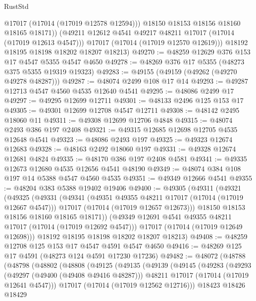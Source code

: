 \begin{lexlean}{RustStd}
\begin{coremodule}
{\begin{coremodule}
{{{{{{{{{{{{{{{{{{{{{{{{{{{{{{{{{{{{{{{{{{{{{{{{{{{{{{{              @17017
              (@17014 (@17019 @12578 @12594)))
            @18150
            @18153
            @18156
            @18160
            @18165
            @18171))
        (@49211 @12612 @4541 @49217 @48211 @17017 (@17014 (@17019 @12613 @4547)))
        @17017
        (@17014 (@17019 @12570 @12619)))
      @18192
      @18195
      @18198
      @18202
      @18207
      @18213)
@49270 := @48259 @12629 @376 @153 @17 @4547 @5355 @4547 @4650
@49278 := @48269 @376 @17 @5355 (@48273 @375 @5355 @19319 @19323)
@49283 := @49155 (@49159 (@49262 (@49270 @49278 @48287)))
@49287 := @48074 @2499 @108 @17 @14
@49293 := @49287 @12713 @4547 @4560 @4535 @12640 @4541
@49295 := @48086 @2499 @17
@49297 := @49295 @12699 @12711
@49301 := @48133 @2496 @125 @153 @17
@49305 := @49301 @12699 @12708 @4547 @12711
@49308 := @48142 @2495 @18060 @11
@49311 := @49308 @12699 @12706 @4848
@49315 := @48074 @2493 @386 @197 @2408
@49321 := @49315 @12685 @12698 @12705 @4535 @12648 @4541
@49323 := @48086 @2493 @197
@49325 := @49323 @12674 @12683
@49328 := @48163 @2492 @18060 @197
@49331 := @49328 @12674 @12681 @4824
@49335 := @48170 @386 @197 @2408 @4581
@49341 := @49335 @12673 @12680 @4535 @12656 @4541 @48190
@49349 := @48074 @384 @108 @197 @14 @5388 @4547 @4560 @4535
@49351 := @49349 @12666 @4541
@49355 := @48204 @383 @5388 @19402 @19406
@49400 := @49305
    (@49311
      (@49321
        (@49325
          (@49331
            (@49341
              (@49351 @49355 @48211 @17017 (@17014 (@17019 @12667 @4547)))
              @17017
              (@17014 (@17019 @12657 @12673)))
            @18150
            @18153
            @18156
            @18160
            @18165
            @18171))
        (@49349 @12691 @4541 @49355 @48211 @17017 (@17014 (@17019 @12692 @4547)))
        @17017
        (@17014 (@17019 @12649 @12698)))
      @18192
      @18195
      @18198
      @18202
      @18207
      @18213)
@49408 := @48259 @12708 @125 @153 @17 @4547 @4591 @4547 @4650
@49416 := @48269 @125 @17 @4591 (@48273 @124 @4591 @17230 @17236)
@49482 := @48072
    (@48788
      (@48798
        (@48802
          (@48808
            (@49125
              (@49135
                (@49139
                  (@49145
                    (@49283
                      (@49293
                        (@49297 (@49400 (@49408 @49416 @48287)))
                        @48211
                        @17017
                        (@17014 (@17019 @12641 @4547)))
                      @17017
                      (@17014 (@17019 @12562 @12716)))
                    @18423
                    @18426
                    @18429
}}}}}}}}}}}}}}}}}}}}}}}}}}}}}}}}}}}}}}}}}}}}}}}}}}}}}}}
\end{coremodule}}
\end{coremodule}
\end{lexlean}
